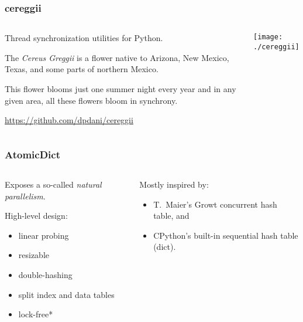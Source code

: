 \documentclass[aspectratio=169]{beamer}
\begin{document}
\begin{frame}
    \frametitle{cereggii}

    \begin{columns}
        \begin{column}{0.5\textwidth}
            Thread synchronization utilities for Python.

            \vspace{1cm}

            The \textit{Cereus Greggii} is a flower native to Arizona, New Mexico, Texas, and some parts of northern Mexico.

            This flower blooms just one summer night every year and in any given area, all these flowers bloom in synchrony.

            \vspace{1cm}
            
            \tiny\url{https://github.com/dpdani/cereggii}
        \end{column}
        \begin{column}{0.5\textwidth}
            \centering\texttt{[image: ./cereggii]}
        \end{column}
    \end{columns}
\end{frame}

\begin{frame}
    \frametitle{AtomicDict}

    \begin{columns}
        \begin{column}{0.5\textwidth}
            Exposes a so-called \textit{natural parallelism}.

            High-level design:
            \begin{itemize}
                \item linear probing
                \item resizable
                \item double-hashing
                \item split index and data tables
                \item lock-free*
            \end{itemize}
        \end{column}
        \begin{column}{0.5\textwidth}
            Mostly inspired by:
            \begin{itemize}
                \item T.\ Maier's Growt concurrent hash table, and
                \item CPython's built-in sequential hash table (dict).
            \end{itemize}
        \end{column}
    \end{columns}
\end{frame}
\end{document}
